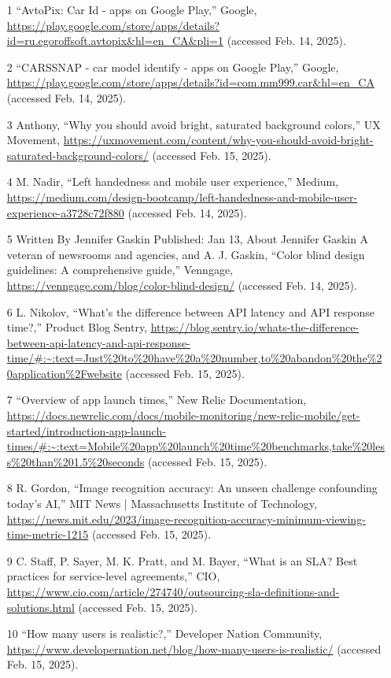 \documentclass[]{article}
\begin{document}
\begin{itemize}
    \item[1] “AvtoPix: Car Id - apps on Google Play,” Google, \url{https://play.google.com/store/apps/details?id=ru.egoroffsoft.avtopix&hl=en_CA&pli=1} (accessed Feb. 14, 2025).
    \item[2] “CARSSNAP - car model identify - apps on Google Play,” Google, \url{https://play.google.com/store/apps/details?id=com.mm999.car&hl=en_CA} (accessed Feb. 14, 2025).
    \item[3] Anthony, “Why you should avoid bright, saturated background colors,” UX Movement, \url{https://uxmovement.com/content/why-you-should-avoid-bright-saturated-background-colors/} (accessed Feb. 15, 2025). 
    \item[4] M. Nadir, “Left handedness and mobile user experience,” Medium, \url{https://medium.com/design-bootcamp/left-handedness-and-mobile-user-experience-a3728c72f880} (accessed Feb. 14, 2025).
    \item[5] Written By Jennifer Gaskin  Published: Jan 13, About Jennifer Gaskin      	A veteran of newsrooms and agencies, and A. J. Gaskin, “Color blind design guidelines: A comprehensive guide,” Venngage, \url{https://venngage.com/blog/color-blind-design/} (accessed Feb. 14, 2025).
	\item[6] L. Nikolov, “What’s the difference between API latency and API response time?,” Product Blog Sentry, \url{https://blog.sentry.io/whats-the-difference-between-api-latency-and-api-response-time/#:~:text=Just%20to%20have%20a%20number,to%20abandon%20the%20application%2Fwebsite} (accessed Feb. 15, 2025). 
	\item[7] “Overview of app launch times,” New Relic Documentation, \url{https://docs.newrelic.com/docs/mobile-monitoring/new-relic-mobile/get-started/introduction-app-launch-times/#:~:text=Mobile%20app%20launch%20time%20benchmarks,take%20less%20than%201.5%20seconds} (accessed Feb. 15, 2025).
	\item[8] R. Gordon, “Image recognition accuracy: An unseen challenge confounding today’s AI,” MIT News | Massachusetts Institute of Technology, \url{https://news.mit.edu/2023/image-recognition-accuracy-minimum-viewing-time-metric-1215} (accessed Feb. 15, 2025).
	\item[9] C. Staff, P. Sayer, M. K. Pratt, and M. Bayer, “What is an SLA? Best practices for service-level agreements,” CIO, \url{https://www.cio.com/article/274740/outsourcing-sla-definitions-and-solutions.html} (accessed Feb. 15, 2025).
	\item[10] “How many users is realistic?,” Developer Nation Community, \url{https://www.developernation.net/blog/how-many-users-is-realistic/} (accessed Feb. 15, 2025).

\end{itemize}
\end{document}
